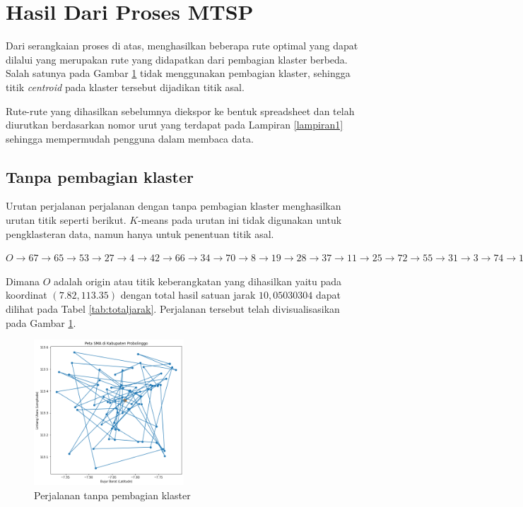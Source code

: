 \section{Hasil Dari Proses MTSP}

Dari serangkaian proses di atas, menghasilkan beberapa rute optimal yang dapat dilalui yang merupakan rute yang didapatkan dari pembagian klaster berbeda. Salah satunya pada Gambar \ref{fig:hasil_mtsp1} tidak menggunakan pembagian klaster, sehingga titik \textit{centroid} pada klaster tersebut dijadikan titik asal.

Rute-rute yang dihasilkan sebelumnya diekspor ke bentuk spreadsheet dan telah diurutkan berdasarkan nomor urut yang terdapat pada Lampiran \ref{lampiran1} sehingga mempermudah pengguna dalam membaca data.

\subsection{Tanpa pembagian klaster}

Urutan perjalanan perjalanan dengan tanpa pembagian klaster menghasilkan urutan titik seperti berikut. $K$-means pada urutan ini tidak digunakan untuk pengklasteran data, namun hanya untuk penentuan titik asal.

\noindent $O \to 67 \to 65 \to 53 \to 27\rightarrow4 \to 42 \to 66 \to 34 \to 70 \to 8 \to 19 \to 28 \to 37 \to 11 \to 25 \to 72 \to 55 \to 31 \to 3 \to 74 \to 15 \to 68 \to 20 \to 44 \to 40 \to 16 \to 30 \to 23 \to 24 \to 63 \to 13 \to 29 \to 50 \to 7 \to 54 \to 2 \to 10 \to 52 \to 64 \to 21 \to 62 \to 58 \to 26 \to 1 \to 69 \to 14 \to 45 \to 61 \to 38 \to 59 \to 17 \to 71 \to 18 \to 32 \to 57 \to 73 \to 75 \to 41 \to 39 \to 49 \to 51 \to 6 \to 60 \to 22 \to 33 \to 48 \to 5 \to 35 \to 46 \to 56 \to 36 \to 47 \to 9 \to 12 \to 43 \to O$

Dimana $O$ adalah origin atau titik keberangkatan yang dihasilkan yaitu pada koordinat $(7.82, 113.35)$ dengan total hasil satuan jarak $10,05030304$ dapat dilihat pada Tabel \ref{tab:totaljarak}. Perjalanan tersebut telah divisualisasikan pada Gambar \ref{fig:hasil_mtsp1}.

\begin{figure}[H]
\centering
\includegraphics[width=0.5\textwidth]{Gambar/hasil_mtsp/1}
\caption{Perjalanan tanpa pembagian klaster}
\label{fig:hasil_mtsp1}
\end{figure}

